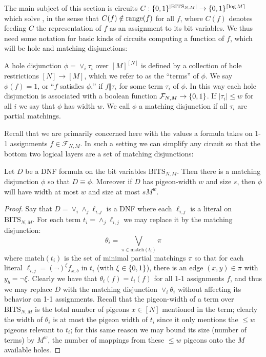 The main subject of this section is circuits $C: \{0,1\}^{|\mathrm{BITS}_{N,M}|} \to \{0,1\}^{\lceil \log M \rceil}$ which solve \avoid, in the sense that $C(f) \notin \mathrm{range}(f)$ for all $f$, where $C(f)$ denotes feeding $C$ the representation of $f$ as an assignment to its bit variables. We thus need some notation for basic kinds of circuits computing a function of $f$, which will be hole and matching disjunctions:
\begin{definition}
A hole disjunction $\phi = \lor_i \tau_i$ over $[M]^{[N]}$ is defined by a collection of hole restrictions $[N] \to [M]$, which we refer to as the ``terms'' of $\phi$. We say $\phi(f)=1$, or ``$f$ satisfies $\phi$,'' if $f \Vert \tau_i$ for some term $\tau_i$ of $\phi$. In this way each hole disjunction is associated with a boolean function $\mathcal{F}_{N,M} \to \{0,1\}$. If $|\tau_i|\leq w$ for all $i$ we say that $\phi$ has width $w$. We call $\phi$ a matching disjunction if all $\tau_i$ are partial matchings.

\end{definition}
Recall that we are primarily concerned here with the values a formula takes on 1-1 assignments $f \in \mathcal{F}_{N,M}$. In such a setting we can simplify any circuit so that the bottom two logical layers are a set of matching disjunctions:
\begin{observation}\label{obs:matching-conversion}
Let $D$ be a DNF formula on the bit variables $\mathrm{BITS}_{N,M}$. Then there is a matching disjunction $\phi$ so that $D \equiv \phi$. Moreover if $D$ has pigeon-width $w$ and size $s$, then $\phi$ will have width at most $w$ and size at most $sM^w$.
\end{observation}

\begin{proof}
Say that $D = \lor_i \land_j \ell_{i,j}$ is a DNF where each $\ell_{i,j}$ is a literal on $\mathrm{BITS}_{N,M}$. For each term $t_i = \land_j \ell_{i,j}$ we may replace it by the matching disjunction:
\[
\theta_i = \bigvee_{\pi \in \mathrm{match}(t_i)} \pi
\]
where $\mathrm{match}(t_i)$ is the set of minimal partial matchings $\pi$ so that for each literal $\ell_{i,j} = (\lnot)^{\xi} f_{x,b}$ in $t_i$ (with $\xi \in \{0,1\}$), there is an edge $(x,y) \in\pi$ with $y_b = \lnot \xi$. Clearly we have that $\theta_i(f) = t_i(f)$ for all 1-1 assignments $f$, and thus we may replace $D$ with the matching disjunction $\lor_i \theta_i$ without affecting its behavior on 1-1 assignments. Recall that the pigeon-width of a term over $\mathrm{BITS}_{N,M}$ is the total number of pigeons $x \in [N]$ mentioned in the term; clearly the width of $\theta_i$ is at most the pigeon width of $t_i$ since it only mentions the $\leq w$ pigeons relevant to $t_i$; for this same reason we may bound its size (number of terms) by $M^w$, the number of mappings from these $\leq w$ pigeons onto the $M$ available holes.
\end{proof}


